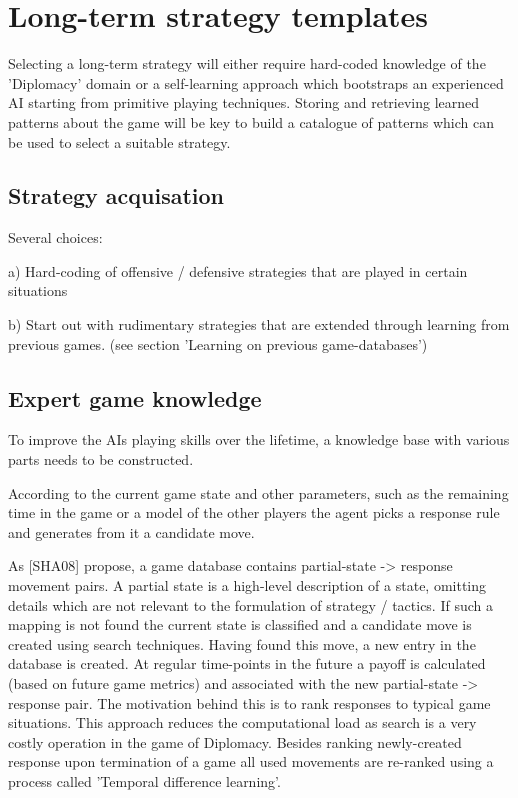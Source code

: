\documentclass[12pt]{article}
\begin{document}
\section{Long-term strategy templates}

Selecting a long-term strategy will either require hard-coded 
knowledge of the 'Diplomacy' domain or a self-learning approach which
bootstraps an experienced AI starting from primitive playing techniques.
Storing and retrieving learned patterns about the game will be key to build
a catalogue of patterns which can be used to select a suitable strategy.

\subsection{Strategy acquisation}

Several choices: 

a) Hard-coding of offensive / defensive 
   strategies that are played in certain
   situations

b) Start out with rudimentary strategies that
   are extended through learning from previous games.
   (see section 'Learning on previous game-databases')

\subsection{Expert game knowledge}

To improve the AIs playing skills over the lifetime, a
knowledge base with various parts needs to be constructed.

According to the current game state and other parameters, such
as the remaining time in the game or a model of the other players
the agent picks a response rule and generates from it a candidate
move. 

As [SHA08] propose, a game database contains partial-state -> response movement
pairs. A partial state is a high-level description of a state, omitting
details which are not relevant to the formulation of strategy / tactics. If
such a mapping is not found the current state is classified and a candidate move
is created using search techniques. Having found this move, a new entry in the 
database is created. At regular time-points in the future a payoff is calculated
(based on future game metrics) and associated with the new partial-state -> response pair.
The motivation behind this is to rank responses to typical game situations. This
approach reduces the computational load as search is a very costly operation in the
game of Diplomacy. Besides ranking newly-created response upon termination of a game
all used movements are re-ranked using a process called 'Temporal difference learning'.
\end{document}
